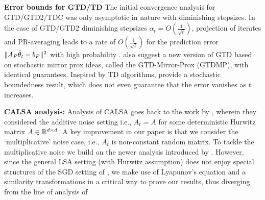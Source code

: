 \textbf{Error bounds for GTD/TD} The initial convergence analysis for GTD/GTD2/TDC was only asymptotic in nature \cite{gtd,gtd2} with diminishing stepsizes.
In the case of GTD/GTD2 diminishing stepsizes $\alpha_t=O(\frac{1}{\sqrt{t}})$, projection of iterates and PR-averaging leads to a rate of $O(\frac{1}{\sqrt{t}})$ 
for the prediction error $\| A_P\hat{\theta}_t-b_P\|^2$ with high probability \cite{gtdmp}. 
\citet{gtdmp} also suggest a new version of GTD based on stochastic mirror prox ideas, called the GTD-Mirror-Prox (GTDMP), with identical guarantees.
Inspired by TD algorithms, \citet{dalal} provide a stochastic boundedness result, 
which does not even guarantee that the error vanishes as $t$ increases.

\textbf{CALSA analysis:} Analysis of CALSA goes back to the work by \citet{polyak-judisky}, wherein they considered the additive noise setting i.e., $A_t=A$ for some deterministic Hurwitz matrix $A\in \mathbb{R}^{d \times d}$. A key improvement in our paper is that we consider the `multiplicative' noise case, i.e., $A_t$ is non-constant random matrix. To tackle the multiplicative noise we build on the newer analysis introduced by \citet{bach}. However, since the general LSA setting (with Hurwitz assumption) does not enjoy special structures of the SGD setting of \citet{bach}, we make use of Lyapunov's equation and a similarity transformations in a critical way to prove our results, thus diverging from the line of analysis of \citeauthor{bach}

